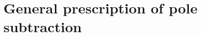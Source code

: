 \documentclass[12pt]{article}
\theoremstyle{definition}
\theoremstyle{plain}
\begin{document}

\section{General prescription of pole subtraction}
\end{document}

